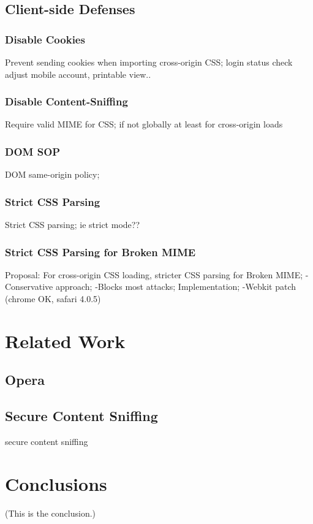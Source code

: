\documentclass{acm_proc_article-sp}
\begin{document}
\subsection{Client-side Defenses}
\subsubsection{Disable Cookies}
Prevent sending cookies when importing cross-origin CSS;
login status check
adjust mobile account, printable view..

\subsubsection{Disable Content-Sniffing}
Require valid MIME for CSS; if not globally at least for cross-origin loads

\subsubsection{DOM SOP}
DOM same-origin policy;

\subsubsection{Strict CSS Parsing}
Strict CSS parsing;
ie strict mode??

\subsubsection{Strict CSS Parsing for Broken MIME}
Proposal: For cross-origin CSS loading, stricter CSS parsing for Broken MIME;
-Conservative approach;
-Blocks most attacks;
Implementation;
-Webkit patch (chrome OK, safari 4.0.5)

\section{Related Work}

\subsection{Opera}

\subsection{Secure Content Sniffing}
secure content sniffing\cite{securecontentsniffing}

\section{Conclusions}
(This is the conclusion.)



\end{document}
